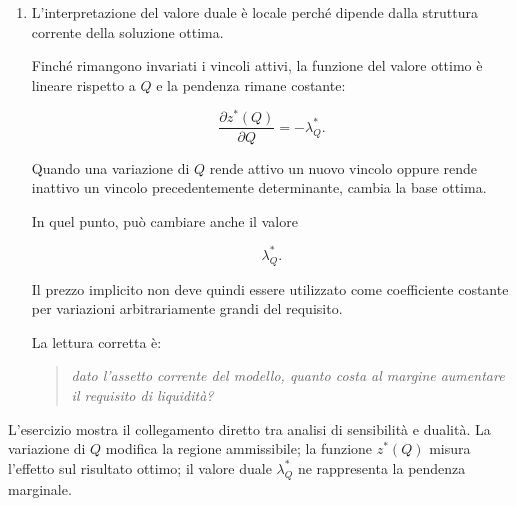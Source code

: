 \begin{enumerate}
\[
0.03507.
\]

La quantit\`a

\[
\lambda_Q^*
\]

pu\`o essere interpretata come il costo opportunit\`a marginale della maggiore
prudenza.

Non si tratta di un costo contabile e non \`e un prezzo osservato sul mercato.
\`E un valore endogeno prodotto dal modello.

\item L'interpretazione del valore duale \`e locale perch\'e dipende dalla
struttura corrente della soluzione ottima.

Finch\'e rimangono invariati i vincoli attivi, la funzione del valore ottimo
\`e lineare rispetto a \(Q\) e la pendenza rimane costante:

\[
\frac{\partial z^*(Q)}
{\partial Q}
=
-\lambda_Q^*.
\]

Quando una variazione di \(Q\) rende attivo un nuovo vincolo oppure rende
inattivo un vincolo precedentemente determinante, cambia la base ottima.

In quel punto, pu\`o cambiare anche il valore

\[
\lambda_Q^*.
\]

Il prezzo implicito non deve quindi essere utilizzato come coefficiente
costante per variazioni arbitrariamente grandi del requisito.

La lettura corretta \`e:

\begin{quote}
\emph{dato l'assetto corrente del modello, quanto costa al margine aumentare
il requisito di liquidit\`a?}
\end{quote}

\end{enumerate}

L'esercizio mostra il collegamento diretto tra analisi di sensibilit\`a e
dualit\`a. La variazione di \(Q\) modifica la regione ammissibile; la funzione
\(z^*(Q)\) misura l'effetto sul risultato ottimo; il valore duale
\(\lambda_Q^*\) ne rappresenta la pendenza marginale.

